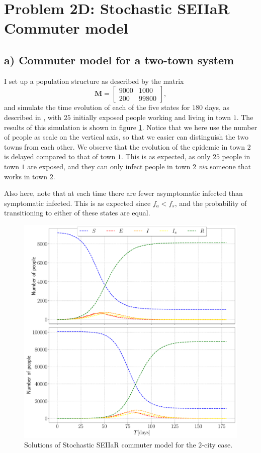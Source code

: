 \section{Problem 2D: Stochastic SEIIaR Commuter model}

\subsection{a) Commuter model for a two-town system}

I set up a population structure as described by the matrix 
$$
	\mathbf{M} = \begin{bmatrix}
	9000 & 1000 \\
	200 & 99800
	\end{bmatrix},
$$
and simulate the time evolution of each of the five states for $180$ days, as described in \cite{sheet}, with $25$ initially exposed people working and living in town $1$. The results of this simulation is shown in figure \ref{fig:commuter_2city}. Notice that we here use the number of people as scale on the vertical axis, so that we easier can distinguish the two towns from each other. We observe that the evolution of the epidemic in town $2$ is delayed compared to that of town $1$. This is as expected, as only $25$ people in town $1$ are exposed, and they can only infect people in town $2$ \textit{via } someone that works in town $2$. 

Also here, note that at each time there are fewer asymptomatic infected than symptomatic infected. This is as expected since $f_a < f_s$, and the probability of transitioning to either of these states are equal.  

\begin{figure}[htb]
	\centering
	\includegraphics[width=0.8\columnwidth]{../fig/2Da_commuter.pdf}
	\caption{Solutions of Stochastic SEIIaR commuter model for the $2$-city case.}
	\label{fig:commuter_2city}
\end{figure}

